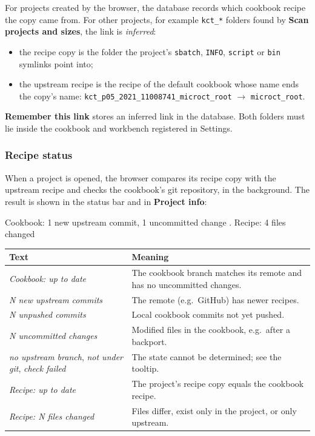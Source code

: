 \documentclass[11pt,a4paper]{article}
\newcommand{\cmd}[1]{\texttt{#1}}
\newcommand{\ui}[1]{\textsf{\textbf{#1}}}
\begin{document}
For projects created by the browser, the database records which cookbook recipe the copy came
from. For other projects, for example \cmd{kct\_*} folders found by \ui{Scan projects and sizes},
the link is \emph{inferred}:
\begin{itemize}
  \item the recipe copy is the folder the project's \cmd{sbatch}, \cmd{INFO}, \cmd{script} or
    \cmd{bin} symlinks point into;
  \item the upstream recipe is the recipe of the default cookbook whose name ends the copy's
    name: \cmd{kct\_p05\_2021\_11008741\_microct\_root} $\rightarrow$ \cmd{microct\_root}.
\end{itemize}
\ui{Remember this link} stores an inferred link in the database. Both folders must lie inside the
cookbook and workbench registered in Settings.

\subsubsection*{Recipe status}\label{sec:recipestatus}

When a project is opened, the browser compares its recipe copy with the upstream recipe and checks
the cookbook's git repository, in the background. The result is shown in the status bar and in
\ui{Project info}:

\begin{terminal}
Cookbook: 1 new upstream commit, 1 uncommitted change . Recipe: 4 files changed
\end{terminal}

\begin{center}
\begin{tabularx}{\linewidth}{@{}l>{\raggedright\arraybackslash}X@{}}
\toprule
Text & Meaning \\
\midrule
\emph{Cookbook: up to date} & The cookbook branch matches its remote and has no uncommitted changes. \\
\emph{N new upstream commits} & The remote (e.g.\ GitHub) has newer recipes. \\
\emph{N unpushed commits} & Local cookbook commits not yet pushed. \\
\emph{N uncommitted changes} & Modified files in the cookbook, e.g.\ after a backport. \\
\emph{no upstream branch}, \emph{not under git}, \emph{check failed} & The state cannot be determined; see the tooltip. \\
\emph{Recipe: up to date} & The project's recipe copy equals the cookbook recipe. \\
\emph{Recipe: N files changed} & Files differ, exist only in the project, or only upstream. \\
\bottomrule
\end{tabularx}
\end{center}
\end{document}
